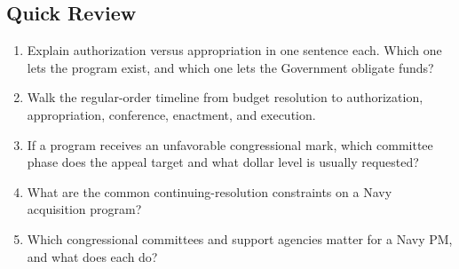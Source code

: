 \documentclass[../main.tex]{subfiles}
\begin{document}
\subsection{Quick Review}
\begin{enumerate}
  \item Explain authorization versus appropriation in one sentence each. Which one lets the program exist, and which one lets the Government obligate funds?
  \item Walk the regular-order timeline from budget resolution to authorization, appropriation, conference, enactment, and execution.
  \item If a program receives an unfavorable congressional mark, which committee phase does the appeal target and what dollar level is usually requested?
  \item What are the common continuing-resolution constraints on a Navy acquisition program?
  \item Which congressional committees and support agencies matter for a Navy PM, and what does each do?
\end{enumerate}
\end{document}
